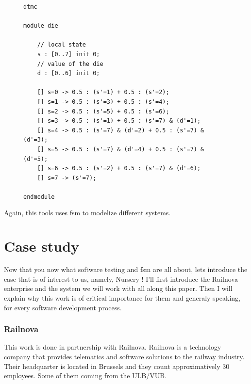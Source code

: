 \documentclass[12pt]{article}
\begin{document}
\begin{figure}
    \label{PRISM_code}
    \begin{lstlisting}[frame=single,caption="Dice model in PRISM",label={lst:PRISM_code}]
dtmc

module die

    // local state
    s : [0..7] init 0;
    // value of the die
    d : [0..6] init 0;

    [] s=0 -> 0.5 : (s'=1) + 0.5 : (s'=2);
    [] s=1 -> 0.5 : (s'=3) + 0.5 : (s'=4);
    [] s=2 -> 0.5 : (s'=5) + 0.5 : (s'=6);
    [] s=3 -> 0.5 : (s'=1) + 0.5 : (s'=7) & (d'=1);
    [] s=4 -> 0.5 : (s'=7) & (d'=2) + 0.5 : (s'=7) & (d'=3);
    [] s=5 -> 0.5 : (s'=7) & (d'=4) + 0.5 : (s'=7) & (d'=5);
    [] s=6 -> 0.5 : (s'=2) + 0.5 : (s'=7) & (d'=6);
    [] s=7 -> (s'=7);

endmodule
    \end{lstlisting}
\end{figure}

Again, this tools uses \gls{fsm} to modelize different systems.


\clearpage
\part{Case study}

Now that you now what software testing and \gls{fsm} are all about, lets introduce the case that is of interest to us, namely, Nursery ! I'll first introduce the Railnova enterprise and the system we will work with all along this paper. Then I will explain why this work is of critical importance for them and generaly speaking, for every software development process.

\clearpage
\section{Railnova}

This work is done in partnership with Railnova. Railnova is a technology company that provides telematics and software solutions to the railway industry. Their headquarter is located in Brussels and they count approximatively 30 employees. Some of them coming from the ULB/VUB.\\
\end{document}
